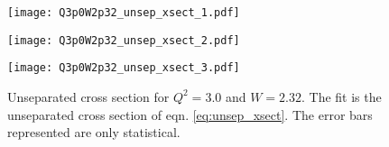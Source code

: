 \begin{figure}
  \centering
  \begin{minipage}[b]{0.48\linewidth}
    \texttt{[image: Q3p0W2p32\_unsep\_xsect\_1.pdf]}
  \end{minipage}
  \hfill
  \begin{minipage}[b]{0.48\linewidth}
    \texttt{[image: Q3p0W2p32\_unsep\_xsect\_2.pdf]}
  \end{minipage}
  \begin{minipage}[b]{0.48\linewidth}
    \texttt{[image: Q3p0W2p32\_unsep\_xsect\_3.pdf]}
  \end{minipage}  
  \caption{Unseparated cross section for $Q^2=3.0$ and $W=2.32$. The fit is the unseparated cross section of eqn. \ref{eq:unsep_xsect}. The error bars represented are only statistical.}
  \label{fig:Q3p0W2p32_unsep_xsect}
\end{figure}

